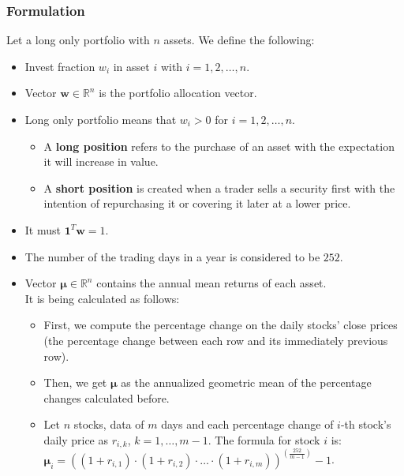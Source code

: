 \documentclass{beamer}
\begin{document}
\begin{frame}
\frametitle{\textbf{Formulation}}

\justifying
Let a long only portfolio with $n$ assets. We define the following:

\vspace{0.4cm}
\begin{itemize}
	\justifying
	\item Invest fraction $w_{i}$ in asset $i$ with $i = 1,2, \dots, n$.
	\item Vector $\mathbf{w} \in \mathbb{R}^{n}$ is the portfolio allocation vector.
	\item Long only portfolio means that $w_{i} > 0$ for $i = 1,2, \dots, n$.
	\begin{itemize}
		\justifying
		\item A \textbf{long position} refers to the purchase of an asset with the expectation it will increase in value.
		\item A \textbf{short position} is created when a trader sells a security first with the intention of repurchasing it or covering it later at a lower price.
	\end{itemize}
	\item It must $\mathbf{1}^{T} \mathbf{w} = 1$.
	\item The number of the trading days in a year is considered to be $252$.
\end{itemize}

\end{frame}

\begin{frame}


\begin{itemize}
	\justifying
	\item Vector $\boldsymbol\mu \in \mathbb{R}^{n}$ contains the annual mean returns of each asset.\\
	It is being calculated as follows:
	\begin{itemize}
		\justifying
		\item First, we compute the percentage change on the daily stocks' close prices (the percentage change between each row and its immediately previous row).
		\item Then, we get $\boldsymbol\mu$ as the annualized geometric mean of the percentage changes calculated before.
		\item Let $n$ stocks, data of $m$ days and each percentage change of $i$-th stock's daily price as $r_{i,k}$, $k = 1, \dots, m-1$. The formula for stock $i$ is:\\
	$\boldsymbol\mu_{i} = {\left((1+r_{i,1}) \cdot (1+r_{i,2}) \cdot \ldots \cdot (1+r_{i,m})\right)}^{(\frac{252}{m-1})} - 1$.
	\end{itemize}
\end{itemize}
	
\end{frame}
\end{document}
